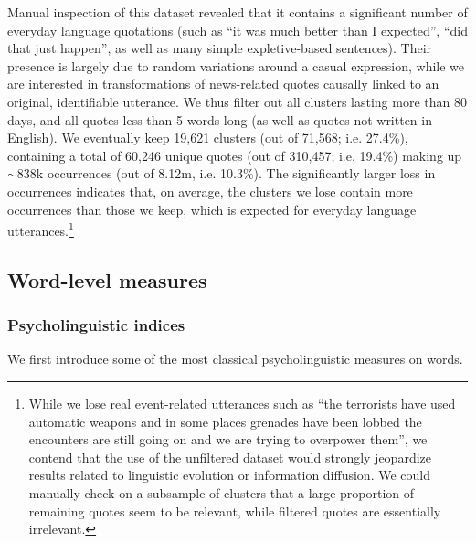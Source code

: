 Manual inspection of this dataset revealed that it contains a significant number of everyday language quotations (such as ``it was much better than I expected'', ``did that just happen'', as well as many simple expletive-based sentences).
Their presence is largely due to random variations around a casual expression, while we are interested in transformations of news-related quotes causally linked to an original, identifiable utterance.
We thus filter out all clusters lasting more than 80 days, and all quotes less than 5 words long %
 (as well as quotes not written in English).
We eventually keep 19,621 clusters (out of 71,568; i.e. 27.4\%), containing a total of 60,246 unique quotes (out of 310,457; i.e. 19.4\%) making up $\sim$838k occurrences (out of 8.12m, i.e. 10.3\%).
The significantly larger loss in occurrences indicates that, on average, the clusters we lose contain more occurrences than those we keep, which is expected for everyday language utterances.\footnote{While we lose real event-related utterances such as ``the terrorists have used automatic weapons and in some places grenades have been lobbed the encounters are still going on and we are trying to overpower them'', we contend that the use of the unfiltered dataset would strongly jeopardize results related to linguistic evolution or information diffusion. We could manually check on a subsample of clusters that a large proportion of remaining quotes seem to be relevant, while filtered quotes are essentially irrelevant.}

\subsection{Word-level measures}


\subsubsection{Psycholinguistic indices}

We first introduce some of the most classical psycholinguistic measures on words.

